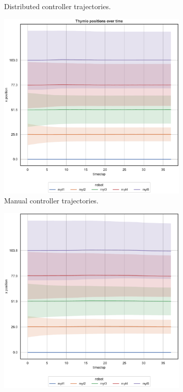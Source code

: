 \begin{figure}[H]
\begin{center}
\begin{subfigure}[h]{0.49\textwidth}
			\caption{Distributed controller trajectories.}
		\end{subfigure}
	\end{center}
	\begin{center}
		\begin{subfigure}[h]{0.49\textwidth}
			\centering			
			\includegraphics[width=.9\textwidth]{contents/images/net-d12/position-overtime-manual}%
			\caption{Manual controller trajectories.}
		\end{subfigure}
		\hfill
		\begin{subfigure}[h]{0.49\textwidth}
			\centering
			\includegraphics[width=.9\textwidth]{contents/images/net-c12/position-overtime-learned_communication}

\end{subfigure}
\end{center}
\end{figure}
